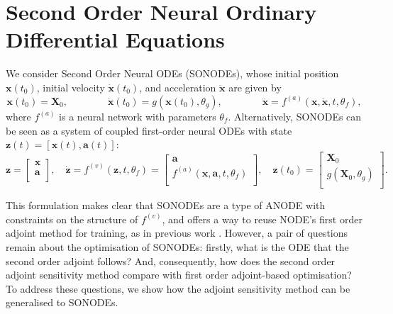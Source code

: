 \documentclass{article}
\theoremstyle{remark}
\theoremstyle{definition}
\begin{document}
\section{Second Order Neural Ordinary Differential Equations}
\label{sec: sonode}

We consider Second Order Neural ODEs (SONODEs), whose initial position $\mathbf{x}(t_{0})$, initial velocity $\dot{\mathbf{x}}(t_{0})$, and acceleration $\ddot{\mathbf{x}}$ are given by
\begin{equation}
\label{eq:sonode_acc_form}
\mathbf{x}(t_{0}) = \mathbf{X}_{0},
\qquad
\qquad
\dot{\mathbf{x}}(t_{0}) = g(\mathbf{x}(t_{0}), \theta_{g}),
\qquad
\qquad
\ddot{\mathbf{x}} = f^{(a)}(\mathbf{x}, \dot{\mathbf{x}}, t, \theta_f),
\end{equation}
where $f^{(a)}$ is a neural network with parameters $\theta_{f}$. Alternatively, SONODEs can be seen as a system of coupled first-order neural ODEs with state $\mathbf{z}(t) = [\mathbf{x}(t), \mathbf{a}(t)]$:
\begin{equation}
\label{eq:sonode_coupled}
    \mathbf{z} = \begin{bmatrix}
           \mathbf{x} \\
           \mathbf{a} \\
         \end{bmatrix},
    \quad
    \dot{\mathbf{z}} = 
    f^{(v)}(\mathbf{z}, t, \theta_{f})
    =
    \begin{bmatrix}
           \mathbf{a} \\
           f^{(a)}(\mathbf{x}, \mathbf{a}, t, \theta_{f}) \\
         \end{bmatrix},
    \quad
    \mathbf{z}(t_0)
         = \begin{bmatrix}
           \mathbf{X}_{0} \\
           g(\mathbf{X}_{0}, \theta_{g}) \\
         \end{bmatrix}.
\end{equation}

This formulation makes clear that SONODEs are a type of ANODE with constraints on the structure of $f^{(v)}$, and offers a way to reuse NODE's first order adjoint method \citep{chen2018neural} for training, as in previous work \citep{yldz2019ode2vae, massaroli2020dissecting}. However, a pair of questions remain about the optimisation of SONODEs: firstly, what is the ODE that the second order adjoint follows? And, consequently, how does the second order adjoint sensitivity method compare with first order adjoint-based optimisation? To address these questions, we show how the adjoint sensitivity method can be generalised to SONODEs.
\end{document}
